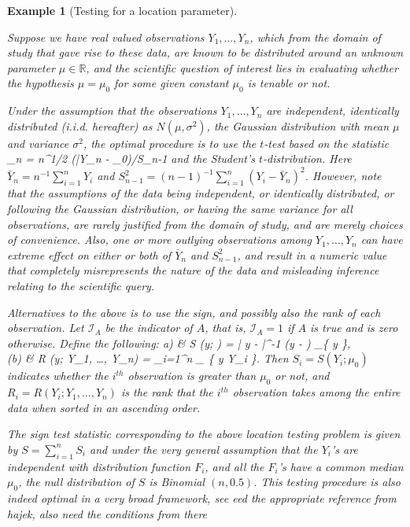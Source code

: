 \documentclass[12pt,letterpaper]{article}
\newcommand{\BR}{\mathbb{R}}
\newcommand{\cI}{\mathcal{I}}
\def\ban#1\ean{\begin{align*}#1\end{align*}}
\def\bredbf#1\eredbf{{\color{red}{\bf ???? #1 ????}}}
\theoremstyle{Example}
\newtheorem{Example}{Example}[section]
\begin{document}
\begin{Example}[Testing for a location parameter]
\label{Example:TestingLocation1d}

Suppose we have real valued observations $Y_{1}, \ldots, Y_{n}$, which from the 
domain of study that gave rise to these data, are known to be distributed around 
an unknown parameter $\mu \in \BR$, and the scientific question of interest lies in 
evaluating  whether the hypothesis $\mu = \mu_{0}$ for some given constant 
$\mu_{0}$ is tenable or not. 

Under the assumption that the observations $Y_{1}, \ldots, Y_{n}$ are 
independent, identically distributed (i.i.d. hereafter) as $N (\mu, \sigma^{2})$, the 
Gaussian distribution with mean $\mu$ and variance $\sigma^{2}$, the optimal 
procedure is to use the $t$-test based on the statistic 
\ban 
T_{n} = n^{1/2} (\bar{Y}_{n} - \mu_{0})/S_{n-1}
\ean
and the Student's $t$-distribution. Here 
$\bar{Y}_{n} = n^{-1} \sum_{i=1}^{n} Y_{i}$ and 
$S_{n- 1}^{2} = (n -1)^{-1} \sum_{i=1}^{n} (Y_{i} - \bar{Y}_{n})^{2}$. 
However, note that the assumptions of the data being  independent, or identically 
distributed, or following the Gaussian distribution, or having the same variance for 
all observations, are rarely justified from the domain of study, and are merely choices of 
convenience. Also, one or more outlying observations among 
$Y_{1}, \ldots, Y_{n}$ can have extreme effect on either or both of 
$\bar{Y}_{n}$ and $S_{n- 1}^{2}$, and result in a numeric value that  completely 
misrepresents the nature of the data and misleading inference relating to the scientific query. 
 
Alternatives to the above is to use the {\it sign}, and possibly also the 
{\it rank} of each observation. Let $\cI_{A}$ be the indicator of  $A$, 
that is, $\cI_{A} = 1$ if $A$ is true and is zero otherwise.
Define the following:
\ban 
(a)  & S (y; \nu) 
= | y - \nu |^{-1} (y - \nu) \cI_{\{ y \ne \nu \}}, \\
(b)  & R (y; Y_{1}, \ldots, Y_{n}) 
= \sum_{i=1}^{n} \cI_{ \{ y \leq Y_{i} \}}.
\ean
Then $S_{i} = S (Y_{i}; \mu_{0})$ indicates whether the $i^{th}$ observation is 
greater than $\mu_{0}$ or not, and $R_{i} = R (Y_{i}; Y_{1}, \ldots, Y_{n})$ is 
the rank that the $i^{th}$ observation takes among the entire data when sorted 
in an ascending order. 

The {\it sign test statistic} corresponding to the above location testing problem
is given by $S = \sum_{i = 1}^{n} S_{i}$ and under the very general assumption 
that the $Y_{i}$'s are independent with distribution function $F_{i}$, and all the 
$F_{i}$'s have a common median $\mu_{0}$, the null distribution of 
$S$ is Binomial $(n, 0.5)$. This testing procedure is also indeed optimal in a 
very broad framework, see 
\bredbf
Need the appropriate reference from hajek, also need the conditions from there 
\eredbf


\end{Example}
\end{document}
